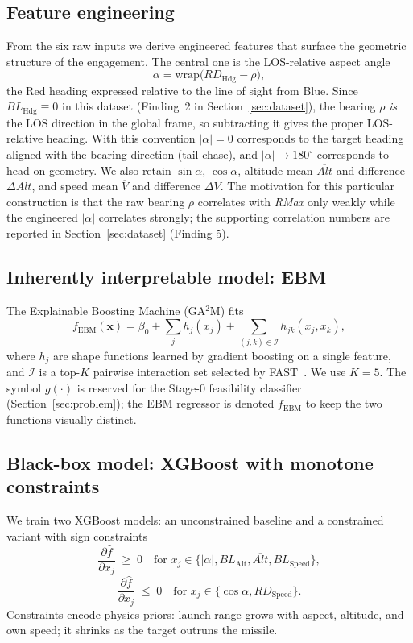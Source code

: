 \documentclass[conference]{IEEEtran}
\begin{document}
\subsection{Feature engineering}
From the six raw inputs we derive engineered features that surface the geometric structure of the engagement. The central one is the LOS-relative aspect angle
\begin{equation*}
    \alpha = \mathrm{wrap}\bigl(RD_{\text{Hdg}} - \rho\bigr),
\end{equation*}
the Red heading expressed relative to the line of sight from Blue. Since $BL_{\text{Hdg}} \equiv 0$ in this dataset (Finding~2 in Section~\ref{sec:dataset}), the bearing $\rho$ \emph{is} the LOS direction in the global frame, so subtracting it gives the proper LOS-relative heading. With this convention $|\alpha| = 0$ corresponds to the target heading aligned with the bearing direction (tail-chase), and $|\alpha| \to 180^{\circ}$ corresponds to head-on geometry. We also retain $\sin\alpha$, $\cos\alpha$, altitude mean $\overline{Alt}$ and difference $\Delta Alt$, and speed mean $\overline{V}$ and difference $\Delta V$. The motivation for this particular construction is that the raw bearing $\rho$ correlates with \textit{RMax} only weakly while the engineered $|\alpha|$ correlates strongly; the supporting correlation numbers are reported in Section~\ref{sec:dataset} (Finding 5).

\subsection{Inherently interpretable model: EBM}
The Explainable Boosting Machine (GA$^2$M) fits
\begin{equation}
    f_{\text{EBM}}(\mathbf{x}) = \beta_0 + \sum_j h_j(x_j) + \sum_{(j,k)\in\mathcal{I}} h_{jk}(x_j, x_k),
\end{equation}
where $h_j$ are shape functions learned by gradient boosting on a single feature, and $\mathcal{I}$ is a top-$K$ pairwise interaction set selected by FAST~\cite{lou2013}. We use $K=5$. The symbol $g(\cdot)$ is reserved for the Stage-0 feasibility classifier (Section~\ref{sec:problem}); the EBM regressor is denoted $f_{\text{EBM}}$ to keep the two functions visually distinct.

\subsection{Black-box model: XGBoost with monotone constraints}
We train two XGBoost models: an unconstrained baseline and a constrained variant with sign constraints
\[
\frac{\partial \hat{f}}{\partial x_j} \;\geq\; 0 \quad \text{for } x_j \in \{|\alpha|, BL_{\text{Alt}}, \overline{Alt}, BL_{\text{Speed}}\},
\]
\[
\frac{\partial \hat{f}}{\partial x_j} \;\leq\; 0 \quad \text{for } x_j \in \{\cos\alpha, RD_{\text{Speed}}\}.
\]
Constraints encode physics priors: launch range grows with aspect, altitude, and own speed; it shrinks as the target outruns the missile.
\end{document}
